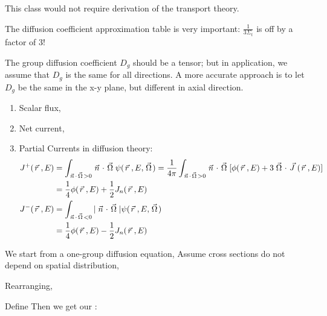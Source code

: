\documentclass{school-22.211-notes}
\date{March 21, 2012}
\begin{document}
\maketitle

This class would not require derivation of the transport theory. 

The diffusion coefficient approximation table is very important: $\frac{1}{3\Sigma_t}$ is off by a factor of 3! 



The group diffusion coefficient $D_g$ should be a tensor; but in application, we assume that $D_g$ is the same for all directions. A more accurate approach is to let $D_g$ be the same in the x-y plane, but different in axial direction. 


\clearpage
{}
\begin{enumerate}
\item Scalar flux, 
\item Net current,
\item Partial Currents in diffusion theory:
  \begin{align}
    J^+(\left.\vec{r}\right., E) &= \int_{\left.\vec{n}\right. \cdot \left.\vec{\Omega}\right. > 0} \left.\vec{n}\right. \cdot \left.\vec{\Omega}\right. \psi(\left.\vec{r}\right., E, \left.\vec{\Omega}\right.) = \frac{1}{4\pi} \int_{\left.\vec{n}\right. \cdot \left.\vec{\Omega}\right. > 0} \left.\vec{n}\right. \cdot \left.\vec{\Omega}\right. [\phi(\left.\vec{r}\right., E) + 3 \left.\vec{\Omega}\right. \cdot \left.\vec{J}\right.(\left.\vec{r}\right., E) ] \\
    &= \frac{1}{4} \phi(\left.\vec{r}\right., E) + \frac{1}{2} J_n (\left.\vec{r}\right., E) \\
    J^-(\left.\vec{r}\right., E) &= \int_{\left.\vec{n}\right. \cdot \left.\vec{\Omega}\right. < 0} |\left.\vec{n}\right. \cdot \left.\vec{\Omega}\right.| \psi(\left.\vec{r}\right., E, \left.\vec{\Omega}\right.)  \\
    &= \frac{1}{4} \phi(\left.\vec{r}\right., E) - \frac{1}{2} J_n (\left.\vec{r}\right., E) 
  \end{align}
\end{enumerate}


\clearpage
{}
We start from a one-group diffusion equation,
Assume cross sections do not depend on spatial distribution, 

Rearranging, 

Define  
Then we get our :
\end{document}
